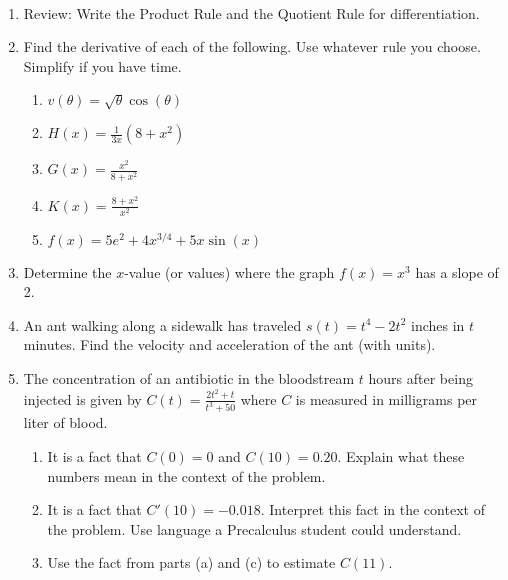 \documentclass[11pt,fleqn]{article}
\begin{document}
\renewcommand{\headrulewidth}{0pt}
\newcommand{\blank}[1]{\rule{#1}{0.75pt}}
\newcommand{\bc}{\begin{center}}
\newcommand{\ec}{\end{center}}
\renewcommand{\d}{\displaystyle}

\vspace*{-0.7in}

\begin{center}
  \large
  \\
\end{center}
\begin{enumerate}
\item Review: Write the Product Rule and the Quotient Rule for differentiation.
\vspace{1in}
\item Find the derivative of each of the following. Use whatever rule you choose. Simplify if you have time.
	\begin{enumerate}
	\item $v(\theta)=\sqrt{\theta}\cos(\theta)$
	\vfill
	\item $H(x)=\frac{1}{3x}(8+x^2)$
	\vfill
	\item $G(x)=\frac{x^2}{8+ x^2}$
	\vfill
	\item $K(x)=\frac{8+ x^2}{x^2}$
	\vfill
	\item $f(x)=5e^2+4{x}^{3/4}+5x\sin(x)$\\
	\vfill
	\end{enumerate}
\newpage
\item Determine the $x$-value (or values) where the graph $f(x)=x^3$ has a slope of 2. 
\vfill

\item An ant walking along a sidewalk has traveled $s(t)=t^4-2t^2$ inches in $t$ minutes.  Find the velocity and acceleration of the ant (with units).

\vfill

\item The concentration of an antibiotic in the bloodstream $t$ hours after being injected is given by $\displaystyle{C(t)=\frac{2t^2+t}{t^3+50}}$ where $C$ is measured in milligrams per liter of blood.	
	\begin{enumerate} 
	\item It is a fact that $C(0)=0$ and $C(10)=0.20.$ Explain what these numbers mean in the context of the problem. \\
	\vspace{.5in}
	
	\item It is a fact that $C'(10)=-0.018.$ Interpret this fact in the context of the problem. Use language a Precalculus student could understand. \\
	\vspace{.5in}
	
	\item Use the fact from parts (a) and (c) to estimate $C(11).$
	\vspace{.5in}
	\end{enumerate}

\end{enumerate}
\end{document}
